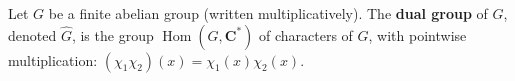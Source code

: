 Let $G$ be a finite abelian group (written multiplicatively). The \textbf{dual group} of $G$, denoted $\hat{G}$, is the group $\operatorname{Hom}(G, \mathbf{C}^*)$ of characters of $G$, with pointwise multiplication: $(\chi_1 \chi_2)(x) = \chi_1(x)\chi_2(x)$.
